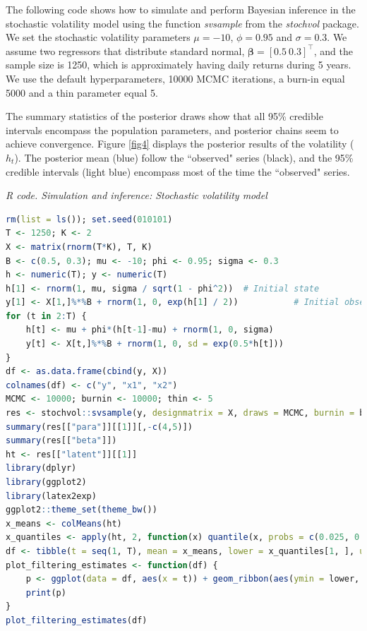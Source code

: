 The following code shows how to simulate and perform Bayesian inference in the stochastic volatility model using the function \textit{svsample} from the \textit{stochvol} package. We set the stochastic volatility parameters $\mu=-10$, $\phi=0.95$ and $\sigma=0.3$. We assume two regressors that distribute standard normal, $\bm{\beta}=[0.5 \ 0.3]^{\top}$, and the sample size is 1250, which is approximately having daily returns during 5 years. We use the default hyperparameters, 10000 MCMC iterations, a burn-in equal 5000 and a thin parameter equal 5.

The summary statistics of the posterior draws show that all 95\% credible intervals encompass the population parameters, and posterior chains seem to achieve convergence. Figure \ref{fig4} displays the posterior results of the volatility ($h_t$). The posterior mean (blue) follow the ``observed" series (black), and the 95\% credible intervals (light blue) encompass most of the time the ``observed" series. 

\begin{tcolorbox}[enhanced,width=4.67in,center upper,
	fontupper=\large\bfseries,drop shadow southwest,sharp corners]
	\textit{R code. Simulation and inference: Stochastic volatility model}
	\begin{VF}
		\begin{lstlisting}[language=R]
rm(list = ls()); set.seed(010101)
T <- 1250; K <- 2
X <- matrix(rnorm(T*K), T, K)
B <- c(0.5, 0.3); mu <- -10; phi <- 0.95; sigma <- 0.3
h <- numeric(T); y <- numeric(T)
h[1] <- rnorm(1, mu, sigma / sqrt(1 - phi^2))  # Initial state
y[1] <- X[1,]%*%B + rnorm(1, 0, exp(h[1] / 2))           # Initial observation
for (t in 2:T) {
	h[t] <- mu + phi*(h[t-1]-mu) + rnorm(1, 0, sigma)
	y[t] <- X[t,]%*%B + rnorm(1, 0, sd = exp(0.5*h[t]))
}
df <- as.data.frame(cbind(y, X))
colnames(df) <- c("y", "x1", "x2")
MCMC <- 10000; burnin <- 10000; thin <- 5
res <- stochvol::svsample(y, designmatrix = X, draws = MCMC, burnin = burnin, thin = thin, priormu = c(0, 100), priorsigma = c(1), priorphi = c(5, 1.5), priorbeta =  c(0, 10000))
summary(res[["para"]][[1]][,-c(4,5)])
summary(res[["beta"]])
ht <- res[["latent"]][[1]]
library(dplyr)
library(ggplot2)
library(latex2exp)
ggplot2::theme_set(theme_bw())
x_means <- colMeans(ht)
x_quantiles <- apply(ht, 2, function(x) quantile(x, probs = c(0.025, 0.975)))
df <- tibble(t = seq(1, T), mean = x_means, lower = x_quantiles[1, ], upper = x_quantiles[2, ], x_true = h, observations = y)
plot_filtering_estimates <- function(df) {
	p <- ggplot(data = df, aes(x = t)) + geom_ribbon(aes(ymin = lower, ymax = upper), alpha = 1, fill = "lightblue") + geom_line(aes(y = x_true), colour = "black", alpha = 1, linewidth = 0.5) + geom_line(aes(y = mean), colour = "blue", linewidth = 0.5) + 	ylab(TeX("$h_{t}$")) + xlab("Time")
	print(p)
}
plot_filtering_estimates(df)
\end{lstlisting}
	\end{VF}
\end{tcolorbox} 

